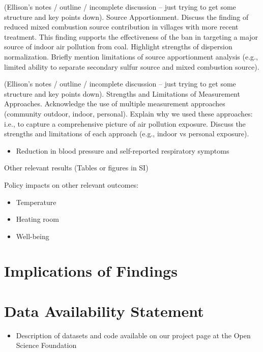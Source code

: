 \documentclass[
  letterpaper,
  DIV=11,
  numbers=noendperiod]{scrartcl}
\providecommand{\tightlist}{%
  \setlength{\itemsep}{0pt}\setlength{\parskip}{0pt}}\usepackage{longtable,booktabs,array}
\begin{document}
(Ellison's notes / outline / incomplete discussion -- just trying to get
some structure and key points down). Source Apportionment. Discuss the
finding of reduced mixed combustion source contribution in villages with
more recent treatment. This finding supports the effectiveness of the
ban in targeting a major source of indoor air pollution from coal.
Highlight strengths of dispersion normalization. Briefly mention
limitations of source apportionment analysis (e.g., limited ability to
separate secondary sulfur source and mixed combustion source).

(Ellison's notes / outline / incomplete discussion -- just trying to get
some structure and key points down). Strengths and Limitations of
Measurement Approaches. Acknowledge the use of multiple measurement
approaches (community outdoor, indoor, personal). Explain why we used
these approaches: i.e., to capture a comprehensive picture of air
pollution exposure. Discuss the strengths and limitations of each
approach (e.g., indoor vs personal exposure).

\begin{itemize}
\tightlist
\item
  Reduction in blood pressure and self-reported respiratory symptoms
\end{itemize}

Other relevant results (Tables or figures in SI)

Policy impacts on other relevant outcomes:

\begin{itemize}
\tightlist
\item
  Temperature
\item
  Heating room
\item
  Well-being
\end{itemize}

\hypertarget{implications-of-findings}{%
\section{Implications of Findings}\label{implications-of-findings}}

\hypertarget{data-availability-statement}{%
\section{Data Availability
Statement}\label{data-availability-statement}}

\begin{itemize}
\tightlist
\item
  Description of datasets and code available on our project page at the
  Open Science Foundation
\end{itemize}
\end{document}

